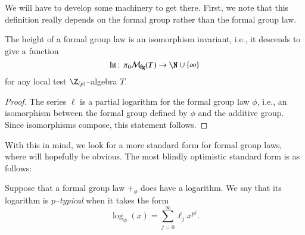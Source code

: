 \noindent We will have to develop some machinery to get there.  First, we note that this definition really depends on the formal group rather than the formal group law.

\begin{lemma}\label{HeightIsAnIsomInvariant}
The height of a formal group law is an isomorphism invariant, i.e., it descends to give a function \[\height\co \pi_0 \moduli{fg}(T) \to \N \cup \{\infty\}\] for any local test $\Z_{(p)}$--algebra $T$.
\end{lemma}
\begin{proof}
The series $\ell$ is a partial logarithm for the formal group law $\phi$, i.e., an isomorphism between the formal group defined by $\phi$ and the additive group.  Since isomorphisms compose, this statement follows.
\end{proof}

With this in mind, we look for a more standard form for formal group laws, where  will hopefully be obvious.  The most blindly optimistic standard form is as follows:
\begin{definition}\label{DefnpTypicalLog}
Suppose that a formal group law $+_\phi$ does have a logarithm.  We say that its logarithm is \textit{$p$--typical} when it takes the form \[\log_\phi(x) = \sum_{j=0}^\infty \ell_j x^{p^j}.\]
\end{definition}

